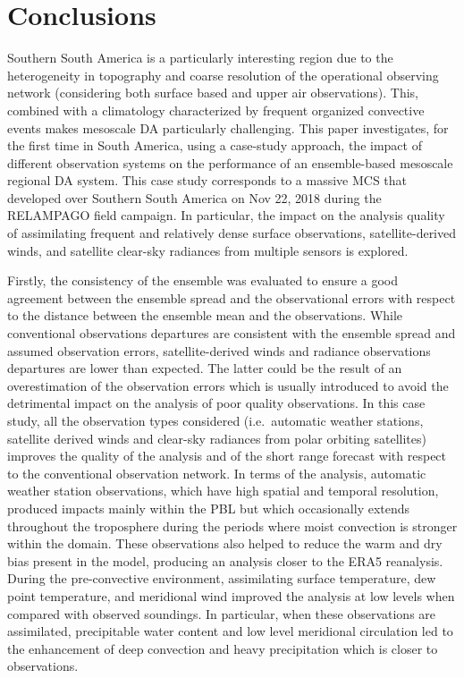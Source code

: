 \documentclass[preprint, 3p, authoryear,review, 12pt]{elsarticle} %
\begin{document}
\hypertarget{conclusions}{%
\section{Conclusions}\label{conclusions}}

Southern South America is a particularly interesting region due to the heterogeneity in topography and coarse resolution of the operational observing network (considering both surface based and upper air observations). This, combined with a climatology characterized by frequent organized convective events makes mesoscale DA particularly challenging. This paper investigates, for the first time in South America, using a case-study approach, the impact of different observation systems on the performance of an ensemble-based mesoscale regional DA system. This case study corresponds to a massive MCS that developed over Southern South America on Nov 22, 2018 during the RELAMPAGO field campaign. In particular, the impact on the analysis quality of assimilating frequent and relatively dense surface observations, satellite-derived winds, and satellite clear-sky radiances from multiple sensors is explored.

Firstly, the consistency of the ensemble was evaluated to ensure a good agreement between the ensemble spread and the observational errors with respect to the distance between the ensemble mean and the observations. While conventional observations departures are consistent with the ensemble spread and assumed observation errors, satellite-derived winds and radiance observations departures are lower than expected. The latter could be the result of an overestimation of the observation errors which is usually introduced to avoid the detrimental impact on the analysis of poor quality observations.
In this case study, all the observation types considered (i.e.~automatic weather stations, satellite derived winds and clear-sky radiances from polar orbiting satellites) improves the quality of the analysis and of the short range forecast with respect to the conventional observation network. In terms of the analysis, automatic weather station observations, which have high spatial and temporal resolution, produced impacts mainly within the PBL but which occasionally extends throughout the troposphere during the periods where moist convection is stronger within the domain. These observations also helped to reduce the warm and dry bias present in the model, producing an analysis closer to the ERA5 reanalysis. During the pre-convective environment, assimilating surface temperature, dew point temperature, and meridional wind improved the analysis at low levels when compared with observed soundings. In particular, when these observations are assimilated, precipitable water content and low level meridional circulation led to the enhancement of deep convection and heavy precipitation which is closer to observations.
\end{document}
